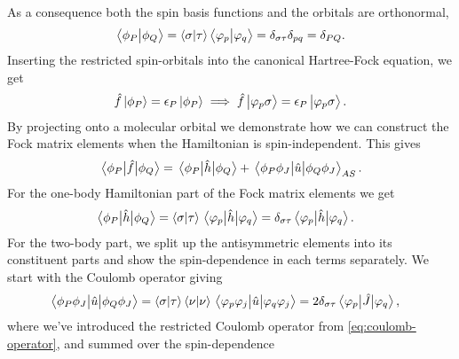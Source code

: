             As a consequence both the spin basis functions and the orbitals are
            orthonormal,
            \begin{align}
                \braket{\phi_P}{\phi_Q}
                = \braket{\sigma}{\tau}
                \braket{\varphi_p}{\varphi_q}
                = \delta_{\sigma \tau}
                \delta_{pq}
                = \delta_{PQ}.
            \end{align}
            Inserting the restricted spin-orbitals into the canonical
            Hartree-Fock equation, we get
            \begin{align}
                \hat{f}\ket{\phi_P} = \epsilon_P\ket{\phi_P}
                \implies
                \hat{f}\ket{\varphi_p\sigma}
                = \epsilon_P\ket{\varphi_p\sigma}.
            \end{align}
            By projecting onto a molecular orbital we demonstrate how we can
            construct the Fock matrix elements when the Hamiltonian is
            spin-independent.
            This gives
            \begin{align}
                \mel{\phi_P}{\hat{f}}{\phi_Q}
                = \mel{\phi_P}{\hat{h}}{\phi_Q}
                + \mel{\phi_P\phi_J}{\hat{u}}{\phi_Q\phi_J}_{AS}.
                \label{eq:mo-fock-elements}
            \end{align}
            For the one-body Hamiltonian part of the Fock matrix elements we get
            \begin{align}
                \mel{\phi_P}{\hat{h}}{\phi_Q}
                &= \braket{\sigma}{\tau}\mel{\varphi_p}{\hat{h}}{\varphi_q}
                = \delta_{\sigma\tau}\mel{\varphi_p}{\hat{h}}{\varphi_q}.
            \end{align}
            For the two-body part, we split up the antisymmetric elements into
            its constituent parts and show the spin-dependence in each terms
            separately.
            We start with the Coulomb operator giving
            \begin{align}
                \mel{\phi_P\phi_J}{\hat{u}}{\phi_Q\phi_J}
                &= \braket{\sigma}{\tau}\braket{\nu}{\nu}
                \mel{\varphi_p\varphi_j}{\hat{u}}{\varphi_q\varphi_j}
                = 2 \delta_{\sigma\tau}
                \mel{\varphi_p}{\hat{J}}{\varphi_q},
            \end{align}
            where we've introduced the restricted Coulomb operator from
            \autoref{eq:coulomb-operator}, and summed over the spin-dependence
